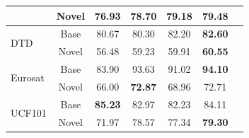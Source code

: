 \begin{table}[htb]
{\begin{tabular}{l c | c c c c c}
& Novel   & 76.93 & 78.70 & 79.18 & \textbf{79.48}\\
\midrule
\multirow{2}{*}{DTD} & Base   & 80.67 & 80.30 & 82.20 & \textbf{82.60} \\
& Novel   & 56.48 & 59.23 & 59.91 & \textbf{60.55} \\
\midrule
\multirow{2}{*}{Eurosat} & Base   & 83.90 & 93.63 & 91.02 & \textbf{94.10} \\
& Novel   & 66.00 & \textbf{72.87} & 68.96 & 72.71 \\
\midrule
\multirow{2}{*}{UCF101} & Base   & \textbf{85.23} & 82.97 & 82.23 & 84.11 \\
& Novel   & 71.97 & 78.57 & 77.34 & \textbf{79.30} \\
\bottomrule
\end{tabular}}
\vspace{-1em}
\end{table}

